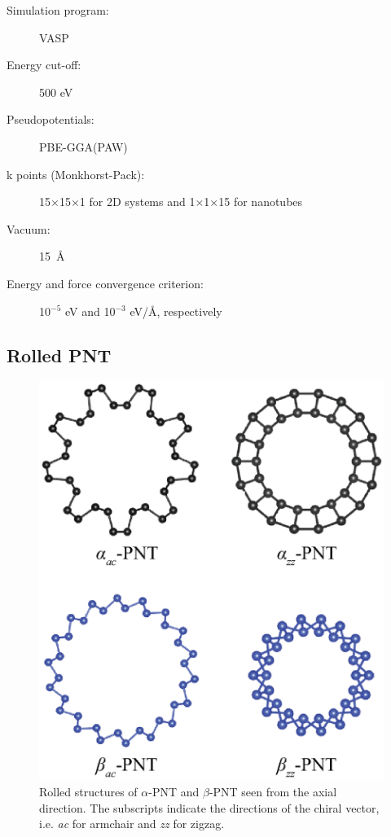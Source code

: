 \begin{footnotesize}
\begin{description}
\item[Simulation program:] VASP
\item[Energy cut-off:] 500 eV
\item[Pseudopotentials:] PBE-GGA(PAW)
\item[k points (Monkhorst-Pack):] 15$\times$15$\times$1 for 2D systems and 1$\times$1$\times$15 for nanotubes
\item[Vacuum:] 15~\AA
\item[Energy and force convergence criterion:] 10$^{-5}$ eV and 10$^{-3}$ eV/\AA, respectively
\end{description}
\end{footnotesize}


\subsection{Rolled PNT}
\begin{figure}[htb]
\centering
\includegraphics[width=0.7\linewidth]{Nanotu_rolled_tubes.eps}%
\caption{Rolled structures of $\alpha$-PNT and $\beta$-PNT seen from the axial direction. The subscripts indicate the directions of the chiral vector, i.e. \textit{ac} for armchair and \textit{zz} for zigzag.\label{natu_rolled}}
\end{figure}

